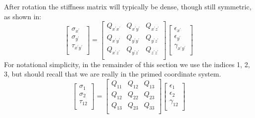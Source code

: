 \documentclass{article}
\begin{document}
After rotation the stiffness matrix will typically be dense, though still symmetric, as shown in:
\begin{equation}
\left[
\begin{matrix}
\sigma_{x^\prime}\\
\sigma_{y^\prime}\\
\tau_{x^\prime y^\prime}\\
\end{matrix}
\right]
=
\left[
\begin{matrix}
Q_{x^\prime x^\prime } & Q_{x^\prime y^\prime} & Q_{x^\prime z^\prime } \\
Q_{x^\prime y^\prime} & Q_{y^\prime y^\prime} & Q_{y^\prime z^\prime } \\
Q_{x^\prime z^\prime } & Q_{y^\prime z^\prime}  & Q_{z^\prime z^\prime} \\
\end{matrix}
\right]
\left[
\begin{matrix}
\epsilon_{x^\prime}\\
\epsilon_{y^\prime}\\
\gamma_{x^\prime y^\prime}\\
\end{matrix}
\right]
\label{eq:KasQ}
\end{equation}
For notational simplicity, in the remainder of this section we use the indices 1, 2, 3, but should recall that we are really in the primed coordinate system.
\begin{equation}
\left[
\begin{matrix}
\sigma_{1}\\
\sigma_{2}\\
\tau_{12}\\
\end{matrix}
\right]
=
\left[
\begin{matrix}
Q_{11} & Q_{12} & Q_{13} \\
Q_{12} & Q_{22} & Q_{23} \\
Q_{13} & Q_{23}  & Q_{33} \\
\end{matrix}
\right]
\left[
\begin{matrix}
\epsilon_{1}\\
\epsilon_{2}\\
\gamma_{12}\\
\end{matrix}
\right]
\label{eq:KasQ}
\end{equation}
\end{document}
